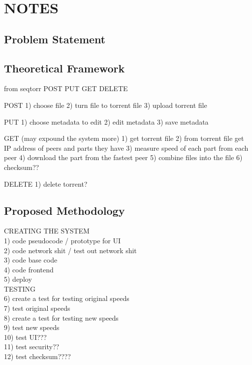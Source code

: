 \documentclass{article}
\begin{document}
\section{NOTES}
\subsection{Problem Statement}

\subsection{Theoretical Framework}
from seqtorr
POST
PUT
GET
DELETE

POST
1) choose file
2) turn file to torrent file
3) upload torrent file

PUT
1) choose metadata to edit
2) edit metadata
3) save metadata

GET (may expound the system more)
1) get torrent file
2) from torrent file get IP address of peers and parts they have
3) measure speed of each part from each peer
4) download the part from the fastest peer
5) combine files into the file
6) checksum??


DELETE
1) delete torrent?    


\subsection{Proposed Methodology}
CREATING THE SYSTEM \\
1) code pseudocode / prototype for UI \\
2) code network shit / test out network shit \\
3) code base code \\




4) code frontend \\
5) deploy \\

TESTING \\
6) create a test for testing original speeds \\
7) test original speeds \\
8) create a test for testing new speeds \\
9) test new speeds \\
10) test UI??? \\
11) test security?? \\
12) test checksum???? \\


%
\end{document}
